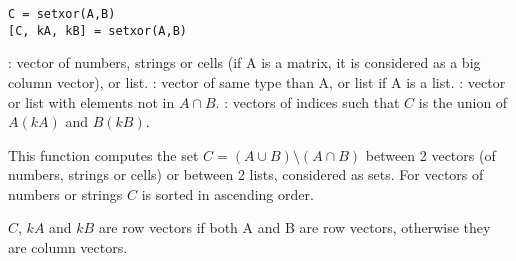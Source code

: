 
\begin{mandesc}
\end{mandesc}

\begin{calling_sequence}
\begin{verbatim}
C = setxor(A,B)
[C, kA, kB] = setxor(A,B)
\end{verbatim}
\end{calling_sequence}
\begin{parameters}
  \begin{varlist}
     : vector of numbers, strings or cells (if A is a matrix, it is
    considered as a big column vector), or list.
     : vector of same type than A, or list if A is a list. 
     : vector or list with elements not in  $A \cap B$.
     : vectors of indices such that $C$  is the union of
    $A(kA)$ and $B(kB)$.
  \end{varlist}
\end{parameters}

\begin{mandescription}
  This function computes the set $C = (A \cup B) \setminus (A \cap B)$
  between 2 vectors (of numbers, strings or cells) or between 2
  lists, considered as sets. For vectors of numbers or strings
  $C$ is sorted in ascending order.

  $C$, $kA$ and $kB$ are row vectors if both A and B are row vectors, otherwise they
  are column vectors.
  
\end{mandescription}


